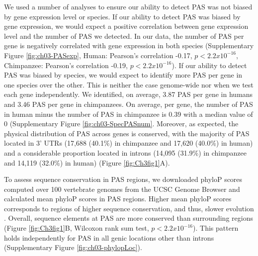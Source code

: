 We used a number of analyses to ensure our ability to detect PAS was not biased by gene expression level or species. If our ability to detect PAS was biased by gene expression, we would expect a positive correlation between gene expression level and the number of PAS we detected. In our data, the number of PAS per gene is negatively correlated with gene expression in both species (Supplementary Figure \ref{fig:ch03-PASexp}, Human: Pearson's correlation -0.17, $p <2.2x10^{-16}$, Chimpanzee: Pearson's correlation -0.19, $p<2.2x10^{-16}$). If our ability to detect PAS was biased by species, we would expect to identify more PAS per gene in one species over the other. This is neither the case genome-wide nor when we test each gene independently. We identified, on average, 3.87 PAS per gene in humans and 3.46 PAS per gene in chimpanzees. On average, per gene, the number of PAS in human minus the number of PAS in chimpanzee is 0.39 with a median value of 0 (Supplementary Figure \ref{fig:ch03-SpecPASnum}. Moreover, as expected, the physical distribution of PAS across genes is conserved, with the majority of PAS located in 3' UTRs (17,688 (40.1\%) in chimpanzee and 17,620 (40.0\%) in human) and a considerable proportion located in introns (14,095 (31.9\%) in chimpanzee and 14,119 (32.0\%) in human) (Figure \ref{fig:Ch3fig1}A).

To assess sequence conservation in PAS regions, we downloaded phyloP scores computed over 100 vertebrate genomes from the UCSC Genome Browser and calculated mean phyloP scores in PAS regions. Higher mean phyloP scores corresponds to regions of higher sequence conservation, and thus, slower evolution \citep{pollard_detection_2010}. Overall, sequence elements at PAS are more conserved than surrounding regions (Figure \ref{fig:Ch3fig1}B, Wilcoxon rank sum test, $p<2.2x10^{-16}$). This pattern holds independently for PAS in all genic locations other than introns (Supplementary Figure \ref{fig:ch03-phylopLoc}). 



